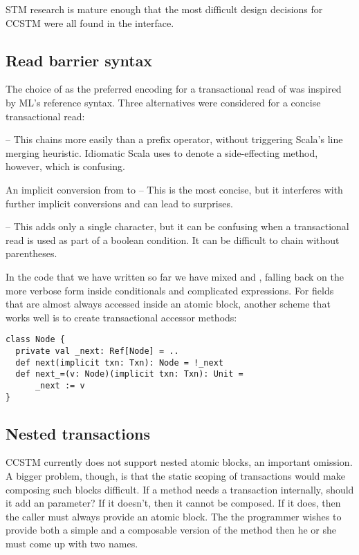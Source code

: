 
STM research is mature enough that the most difficult design decisions
for CCSTM were all found in the interface.

\subsection{Read barrier syntax}

The choice of  as the preferred encoding for a transactional
read of  was inspired by ML's reference syntax.  Three alternatives
were considered for a concise transactional read:
\begin{packed_enum}
\item {} -- This chains more easily than a prefix operator, without
triggering Scala's line merging heuristic.  Idiomatic Scala uses \code{()} to
denote a side-effecting method, however, which is confusing.
\item An implicit conversion from  to  -- This is
the most concise, but it interferes with further implicit conversions and
can lead to surprises.
\item {} -- This adds only a single character, but it can be
confusing when a transactional read is used as part of a boolean condition.
It can be difficult to chain without parentheses.
\end{packed_enum}

In the code that we have written so far we have mixed  and
, falling back on the more verbose form inside conditionals and
complicated expressions.  For fields that are almost always accessed inside
an atomic block, another scheme that works well is to create transactional
accessor methods:
\lstset{numbers=none}
\begin{lstlisting}
class Node {
  private val _next: Ref[Node] = ..
  def next(implicit txn: Txn): Node = !_next
  def next_=(v: Node)(implicit txn: Txn): Unit =
      _next := v
}
\end{lstlisting}
\lstset{numbers=left}

\subsection{Nested transactions}

CCSTM currently does not support nested atomic blocks, an important
omission.  A bigger problem, though, is that the static scoping
of transactions would make composing such blocks difficult.  If a
method  needs a transaction internally, should it add an
  parameter?  If it doesn't, then it
cannot be composed.  If it does, then the caller must always provide
an atomic block.  The the programmer wishes to provide both a simple
and a composable version of the method then he or she must come up with
two names.

